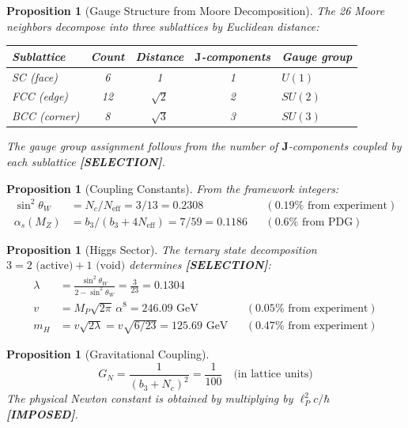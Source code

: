 \documentclass[12pt]{article}
\newtheorem{proposition}[theorem]{Proposition}
\theoremstyle{definition}
\theoremstyle{remark}
\begin{document}
\begin{proposition}[Gauge Structure from Moore Decomposition]
The 26 Moore neighbors decompose into three sublattices by Euclidean distance:
\begin{center}
\renewcommand{\arraystretch}{1.2}
\begin{tabular}{@{}lcccl@{}}
\toprule
Sublattice & Count & Distance & $\mathbf{J}$-components & Gauge group \\
\midrule
SC (face) & 6 & 1 & 1 & $U(1)$ \\
FCC (edge) & 12 & $\sqrt{2}$ & 2 & $SU(2)$ \\
BCC (corner) & 8 & $\sqrt{3}$ & 3 & $SU(3)$ \\
\bottomrule
\end{tabular}
\end{center}
The gauge group assignment follows from the number of $\mathbf{J}$-components coupled by each sublattice \textbf{[SELECTION]}.
\end{proposition}

\begin{proposition}[Coupling Constants]
From the framework integers:
\begin{align}
    \sin^2\theta_W &= N_c / N_{\mathrm{eff}} = 3/13 = 0.2308 && (0.19\%\text{ from experiment}) \\
    \alpha_s(M_Z) &= b_3 / (b_3 + 4N_{\mathrm{eff}}) = 7/59 = 0.1186 && (0.6\%\text{ from PDG})
\end{align}
\end{proposition}

\begin{proposition}[Higgs Sector]
The ternary state decomposition $3 = 2\text{ (active)} + 1\text{ (void)}$ determines \textbf{[SELECTION]}:
\begin{align}
    \lambda &= \frac{\sin^2\theta_W}{2 - \sin^2\theta_W} = \frac{3}{23} = 0.1304 \\
    v &= M_P\sqrt{2\pi}\,\alpha^8 = 246.09\text{ GeV} && (0.05\%\text{ from experiment}) \\
    m_H &= v\sqrt{2\lambda} = v\sqrt{6/23} = 125.69\text{ GeV} && (0.47\%\text{ from experiment})
\end{align}
\end{proposition}

\begin{proposition}[Gravitational Coupling]
\begin{equation}
    G_N = \frac{1}{(b_3 + N_c)^2} = \frac{1}{100} \quad\text{(in lattice units)}
\end{equation}
The physical Newton constant is obtained by multiplying by $\ell_P^2 c / \hbar$ \textbf{[IMPOSED]}.
\end{proposition}
\end{document}
